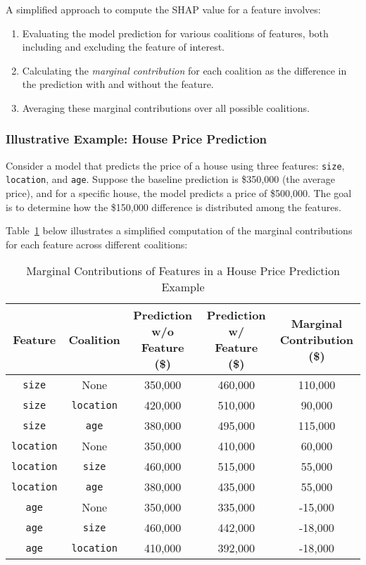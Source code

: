 \documentclass[acmlarge]{acmart}
\begin{document}
A simplified approach to compute the SHAP value for a feature involves:
\begin{enumerate}
    \item Evaluating the model prediction for various coalitions of features, both including and excluding the feature of interest.
    \item Calculating the \emph{marginal contribution} for each coalition as the difference in the prediction with and without the feature.
    \item Averaging these marginal contributions over all possible coalitions.
\end{enumerate}

\subsubsection{Illustrative Example: House Price Prediction}

Consider a model that predicts the price of a house using three features: \texttt{size}, \texttt{location}, and \texttt{age}. Suppose the baseline prediction is \$350,000 (the average price), and for a specific house, the model predicts a price of \$500,000. The goal is to determine how the \$150,000 difference is distributed among the features.

Table~\ref{tab:shapley_calculation} below illustrates a simplified computation of the marginal contributions for each feature across different coalitions:

\begin{table}[H]
    \caption{Marginal Contributions of Features in a House Price Prediction Example}
    \label{tab:shapley_calculation}
    \centering
    \begin{tabular}{|c|c|c|c|c|}
        \hline
        \textbf{Feature} & \textbf{Coalition} & \textbf{Prediction w/o Feature (\$)} & \textbf{Prediction w/ Feature (\$)} & \textbf{Marginal Contribution (\$)} \\
        \hline
        \texttt{size}     & None             & 350,000 & 460,000 & 110,000 \\
        \texttt{size}     & \texttt{location} & 420,000 & 510,000 & 90,000  \\
        \texttt{size}     & \texttt{age}      & 380,000 & 495,000 & 115,000 \\
        \hline
        \texttt{location} & None             & 350,000 & 410,000 & 60,000  \\
        \texttt{location} & \texttt{size}    & 460,000 & 515,000 & 55,000  \\
        \texttt{location} & \texttt{age}     & 380,000 & 435,000 & 55,000  \\
        \hline
        \texttt{age}      & None             & 350,000 & 335,000 & -15,000 \\
        \texttt{age}      & \texttt{size}    & 460,000 & 442,000 & -18,000 \\
        \texttt{age}      & \texttt{location}& 410,000 & 392,000 & -18,000 \\
        \hline
    \end{tabular}
\end{table}
\end{document}
